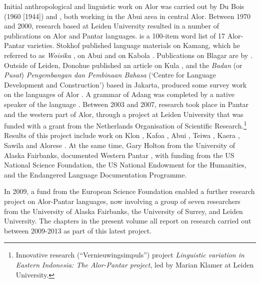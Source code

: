 Initial anthropological and linguistic work on Alor was carried out by Du Bois (1960 [1944]) and \citet{Nicolspeyer1940}, both working in the Abui area in central Alor. Between 1970 and 2000, research based at Leiden University resulted in a number of publications on Alor and Pantar languages. \citet{Stokhof1975} is a 100-item word list of 17 Alor-Pantar varieties. Stokhof published language materials on Kamang, which he referred to as \textit{Woisika} \citep{Stokhof1977,Stokhof1978,Stokhof1979,Stokhof1982,Stokhof1983}, on Abui \citep{Stokhof1984} and on Kabola \citep{Stokhof1987}. Publications on Blagar are by \citet{Steinhauer1977,Steinhauer1991,Steinhauer1993,Steinhauer1995,Steinhauer1999,Steinhauer2010,Steinhauer2012,Steinhauerta}. 
Outside of Leiden, Donohue published an article on Kula \citep{Donohue1996}, and the \textit{Badan} (or \textit{Pusat}) \textit{Pengembangan dan Pembinaan Bahasa} (`Centre for Language Development and Construction') based in Jakarta, produced some survey work on the languages of Alor \citep{MartisEtAl2000}. A grammar of Adang was completed by a native speaker of the language \citep{Haan2001}. 
Between 2003 and 2007, research took place in Pantar and the western part of Alor, through a project at Leiden University that was funded with a grant from the Netherlands Organisation of Scientific Research.\footnote{Innovative research (``Vernieuwingsimpuls'') project \textit{Linguistic variation in Eastern Indonesia: The Alor-Pantar project}, led by Marian Klamer at Leiden University.} Results of this project include work on 
Klon \citep{Baird2005,Baird2008,Baird2010},
Kafoa \citep{Bairdta},
Abui \citep{Kratochvil2007,KratochvilEtAl2008,KlamerEtAl2006,KlamerEtAl2010nusantara,Kratochvil2011discourse,Kratochvil2011transitivity},
Teiwa \citep{Klamer2010grammar,Klamer2010ditransitive,Klamer2010item,KlamerEtAl2006,Klamer2011,Klamer2012},
Kaera \citep{Klamer2010ditransitive,Klamertanumeral}, 
Sawila \citep{Kratochvilta} and 
Alorese \citep{Klamer2011,Klamer2012}. 
At the same time, Gary Holton from the University of Alaska Fairbanks, documented 
Western Pantar \citep{Holton2008,Holton2010person,Holton2011,HoltonEtAl2008,Holtontanumeral,Holtontawesternpantar}, with funding from the US National Science Foundation, the US National Endowment for the Humanities, and the Endangered Language Documentation Programme.

In 2009, a fund from the European Science Foundation enabled a further research project on Alor-Pantar languages, now involving a group of seven researchers from the University of Alaska Fairbanks, the University of Surrey, and Leiden University. The chapters in the present volume all report on research carried out between 2009-2013 as part of this latest project.


